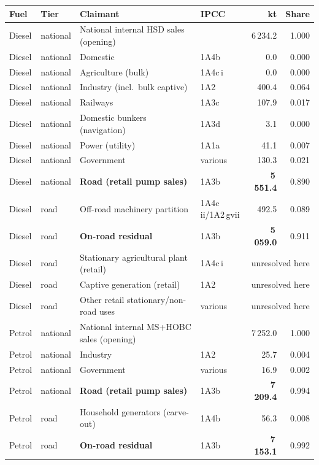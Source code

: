 \begin{table}[htbp]
\centering
\scriptsize
\begin{tabular}{@{}llllrr@{}}
\toprule
\textbf{Fuel} & \textbf{Tier} & \textbf{Claimant} & \textbf{IPCC} & \textbf{kt} &
\textbf{Share} \\
\midrule
Diesel & national & National internal HSD sales (opening) &  & 6\,234.2 & 1.000 \\
Diesel & national & Domestic & 1A4b & 0.0 & 0.000 \\
Diesel & national & Agriculture (bulk) & 1A4c\,i & 0.0 & 0.000 \\
Diesel & national & Industry (incl.\ bulk captive) & 1A2 & 400.4 & 0.064 \\
Diesel & national & Railways & 1A3c & 107.9 & 0.017 \\
Diesel & national & Domestic bunkers (navigation) & 1A3d & 3.1 & 0.000 \\
Diesel & national & Power (utility) & 1A1a &  41.1 & 0.007 \\
Diesel & national & Government & various & 130.3 & 0.021 \\
Diesel & national & \textbf{Road (retail pump sales)} & 1A3b & \textbf{5\,551.4} & 0.890 \\
\midrule
Diesel & road & Off-road machinery partition & 1A4c\,ii/1A2\,gvii & 492.5 & 0.089 \\
Diesel & road & \textbf{On-road residual} & 1A3b & \textbf{5\,059.0} & 0.911 \\
Diesel & road & Stationary agricultural plant (retail) & 1A4c\,i &
  \multicolumn{2}{c}{unresolved here} \\
Diesel & road & Captive generation (retail) & 1A2 &
  \multicolumn{2}{c}{unresolved here} \\
Diesel & road & Other retail stationary/non-road uses & various &
  \multicolumn{2}{c}{unresolved here} \\
\midrule
Petrol & national & National internal MS+HOBC sales (opening) &  & 7\,252.0 & 1.000 \\
Petrol & national & Industry & 1A2 & 25.7 & 0.004 \\
Petrol & national & Government & various & 16.9 & 0.002 \\
Petrol & national & \textbf{Road (retail pump sales)} & 1A3b & \textbf{7\,209.4} & 0.994 \\
\midrule
Petrol & road & Household generators (carve-out) & 1A4b & 56.3 & 0.008 \\
Petrol & road & \textbf{On-road residual} & 1A3b & \textbf{7\,153.1} & 0.992 \\

\end{tabular}
\end{table}
